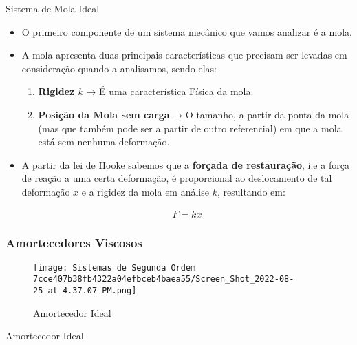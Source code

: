 \documentclass[]{article}
\providecommand{\tightlist}{%
  \setlength{\itemsep}{0pt}\setlength{\parskip}{0pt}}
\begin{document}
  Sistema de Mola Ideal

  \begin{itemize}
  \item
    O primeiro componente de um sistema mecânico que vamos analizar é a
    mola.
  \item
    A mola apresenta duas principais características que precisam ser
    levadas em consideração quando a analisamos, sendo elas:

    \begin{enumerate}
    \def\labelenumi{\arabic{enumi}.}
    \tightlist
    \item
      \textbf{Rigidez \(k\)} → É uma característica Física da mola.
    \item
      \textbf{Posição da Mola sem carga} → O tamanho, a partir da ponta da
      mola (mas que também pode ser a partir de outro referencial) em que
      a mola está sem nenhuma deformação.
    \end{enumerate}
  \item
    A partir da lei de Hooke sabemos que a \textbf{forçada de
    restauração}, i.e a força de reação a uma certa deformação, é
    proporcional ao deslocamento de tal deformação \(x\) e a rigidez da
    mola em análise \(k\), resultando em:

    \[
      \begin{align}
      F = kx
      \end{align}
      \]
  \end{itemize}

  \hypertarget{amortecedores-viscosos}{%
  \subsubsection{Amortecedores Viscosos}\label{amortecedores-viscosos}}

  \begin{figure}
  \centering
  \texttt{[image: Sistemas de Segunda Ordem 7cce407b38fb4322a04efbceb4baea55/Screen\_Shot\_2022-08-25\_at\_4.37.07\_PM.png]}
  \caption{Amortecedor Ideal}
  \end{figure}

  Amortecedor Ideal
\end{document}
